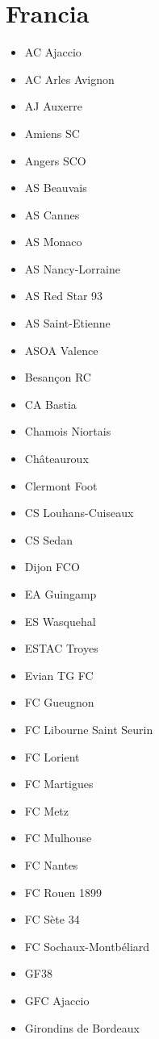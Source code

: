 \section{Francia}
\begin{multicols}{2}
	\begin{itemize}
	    \setlength{\itemsep}{1pt}
	    \setlength{\parskip}{0pt}
	    \setlength{\parsep}{0pt}
		\item AC Ajaccio
		\item AC Arles Avignon
		\item AJ Auxerre
		\item Amiens SC
		\item Angers SCO
		\item AS Beauvais
		\item AS Cannes
		\item AS Monaco
		\item AS Nancy-Lorraine
		\item AS Red Star 93
		\item AS Saint-Etienne
		\item ASOA Valence
		\item Besançon RC
		\item CA Bastia
		\item Chamois Niortais
		\item Châteauroux
		\item Clermont Foot
		\item CS Louhans-Cuiseaux
		\item CS Sedan
		\item Dijon FCO
		\item EA Guingamp
		\item ES Wasquehal
		\item ESTAC Troyes
		\item Evian TG FC
		\item FC Gueugnon
		\item FC Libourne Saint Seurin
		\item FC Lorient
		\item FC Martigues
		\item FC Metz
		\item FC Mulhouse
		\item FC Nantes
		\item FC Rouen 1899
		\item FC Sète 34
		\item FC Sochaux-Montbéliard
		\item GF38
		\item GFC Ajaccio
		\item Girondins de Bordeaux

\end{itemize}
\end{multicols}
